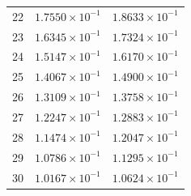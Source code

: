 \begin{table}[H]
\begin{tabular}{@{}rrr@{}}
22 & $1.7550\times10^{-1}$ & $1.8633\times10^{-1}$\\
23 & $1.6345\times10^{-1}$ & $1.7324\times10^{-1}$\\
24 & $1.5147\times10^{-1}$ & $1.6170\times10^{-1}$\\
25 & $1.4067\times10^{-1}$ & $1.4900\times10^{-1}$\\
26 & $1.3109\times10^{-1}$ & $1.3758\times10^{-1}$\\
27 & $1.2247\times10^{-1}$ & $1.2883\times10^{-1}$\\
28 & $1.1474\times10^{-1}$ & $1.2047\times10^{-1}$\\
29 & $1.0786\times10^{-1}$ & $1.1295\times10^{-1}$\\
30 & $1.0167\times10^{-1}$ & $1.0624\times10^{-1}$\\
\bottomrule
\end{tabular}
\end{table}

